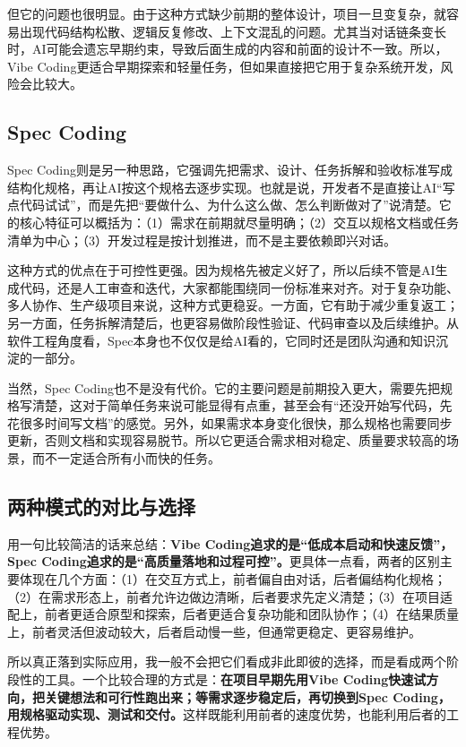 \documentclass[UTF8]{ctexart}
\begin{document}
但它的问题也很明显。由于这种方式缺少前期的整体设计，项目一旦变复杂，就容易出现代码结构松散、逻辑反复修改、上下文混乱的问题。尤其当对话链条变长时，AI可能会遗忘早期约束，导致后面生成的内容和前面的设计不一致。所以，Vibe Coding更适合早期探索和轻量任务，但如果直接把它用于复杂系统开发，风险会比较大。

\subsection{Spec Coding}

Spec Coding则是另一种思路，它强调先把需求、设计、任务拆解和验收标准写成结构化规格，再让AI按这个规格去逐步实现。也就是说，开发者不是直接让AI“写点代码试试”，而是先把“要做什么、为什么这么做、怎么判断做对了”说清楚。它的核心特征可以概括为：（1）需求在前期就尽量明确；（2）交互以规格文档或任务清单为中心；（3）开发过程是按计划推进，而不是主要依赖即兴对话。

这种方式的优点在于可控性更强。因为规格先被定义好了，所以后续不管是AI生成代码，还是人工审查和迭代，大家都能围绕同一份标准来对齐。对于复杂功能、多人协作、生产级项目来说，这种方式更稳妥。一方面，它有助于减少重复返工；另一方面，任务拆解清楚后，也更容易做阶段性验证、代码审查以及后续维护。从软件工程角度看，Spec本身也不仅仅是给AI看的，它同时还是团队沟通和知识沉淀的一部分。

当然，Spec Coding也不是没有代价。它的主要问题是前期投入更大，需要先把规格写清楚，这对于简单任务来说可能显得有点重，甚至会有“还没开始写代码，先花很多时间写文档”的感觉。另外，如果需求本身变化很快，那么规格也需要同步更新，否则文档和实现容易脱节。所以它更适合需求相对稳定、质量要求较高的场景，而不一定适合所有小而快的任务。

\subsection{两种模式的对比与选择}

用一句比较简洁的话来总结：\textbf{Vibe Coding追求的是“低成本启动和快速反馈”，Spec Coding追求的是“高质量落地和过程可控”。}更具体一点看，两者的区别主要体现在几个方面：（1）在交互方式上，前者偏自由对话，后者偏结构化规格；（2）在需求形态上，前者允许边做边清晰，后者要求先定义清楚；（3）在项目适配上，前者更适合原型和探索，后者更适合复杂功能和团队协作；（4）在结果质量上，前者灵活但波动较大，后者启动慢一些，但通常更稳定、更容易维护。

所以真正落到实际应用，我一般不会把它们看成非此即彼的选择，而是看成两个阶段性的工具。一个比较合理的方式是：\textbf{在项目早期先用Vibe Coding快速试方向，把关键想法和可行性跑出来；等需求逐步稳定后，再切换到Spec Coding，用规格驱动实现、测试和交付。}这样既能利用前者的速度优势，也能利用后者的工程优势。
\end{document}
